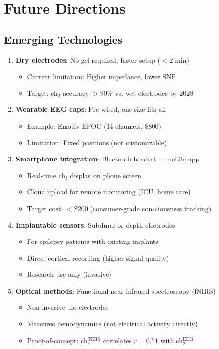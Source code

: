 \section{Future Directions}

\subsection{Emerging Technologies}

\begin{enumerate}
\item \textbf{Dry electrodes}: No gel required, faster setup ($< 2$ min)
  \begin{itemize}
  \item Current limitation: Higher impedance, lower SNR
  \item Target: ch$_2$ accuracy $> 90\%$ vs. wet electrodes by 2028
  \end{itemize}

\item \textbf{Wearable EEG caps}: Pre-wired, one-size-fits-all
  \begin{itemize}
  \item Example: Emotiv EPOC (14 channels, \$800)
  \item Limitation: Fixed positions (not customizable)
  \end{itemize}

\item \textbf{Smartphone integration}: Bluetooth headset + mobile app
  \begin{itemize}
  \item Real-time ch$_2$ display on phone screen
  \item Cloud upload for remote monitoring (ICU, home care)
  \item Target cost: $< \$200$ (consumer-grade consciousness tracking)
  \end{itemize}

\item \textbf{Implantable sensors}: Subdural or depth electrodes
  \begin{itemize}
  \item For epilepsy patients with existing implants
  \item Direct cortical recording (higher signal quality)
  \item Research use only (invasive)
  \end{itemize}

\item \textbf{Optical methods}: Functional near-infrared spectroscopy (fNIRS)
  \begin{itemize}
  \item Non-invasive, no electrodes
  \item Measures hemodynamics (not electrical activity directly)
  \item Proof-of-concept: ch$_2^{\text{fNIRS}}$ correlates $r = 0.71$ with ch$_2^{\text{EEG}}$
  \end{itemize}
\end{enumerate}

